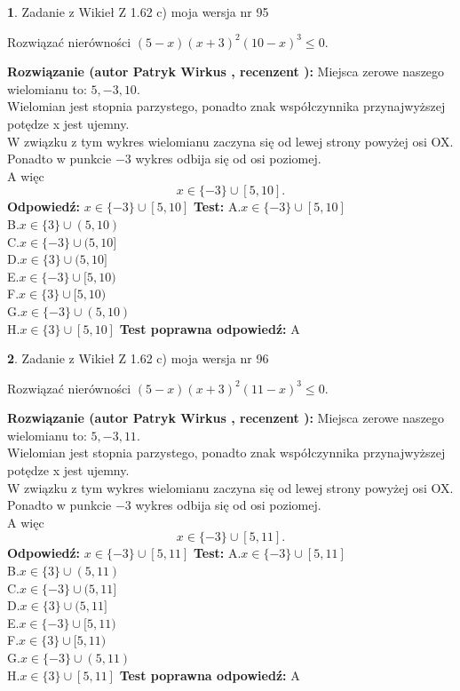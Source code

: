 \documentclass[12pt, a4paper]{article}
\theoremstyle{definition} %
\newtheorem{zad}{}
\newcommand{\zadStart}[1]{\begin{zad}#1\newline}
\newcommand{\zadStop}{\end{zad}}
\newcommand{\rozwStart}[2]{\noindent \textbf{Rozwiązanie (autor #1 , recenzent #2): }\newline}
\newcommand{\rozwStop}{\newline}
\newcommand{\odpStart}{\noindent \textbf{Odpowiedź:}\newline}
\newcommand{\odpStop}{\newline}
\newcommand{\testStart}{\noindent \textbf{Test:}\newline}
\newcommand{\testStop}{\newline}
\newcommand{\kluczStart}{\noindent \textbf{Test poprawna odpowiedź:}\newline}
\newcommand{\kluczStop}{\newline}
\begin{document}
\zadStart{Zadanie z Wikieł Z 1.62 c) moja wersja nr 95}

Rozwiązać nierówności $(5-x)(x+3)^{2}(10-x)^{3}\le0$.
\zadStop
\rozwStart{Patryk Wirkus}{}
Miejsca zerowe naszego wielomianu to: $5, -3, 10$.\\
Wielomian jest stopnia parzystego, ponadto znak współczynnika przy\linebreak najwyższej potędze x jest ujemny.\\ W związku z tym wykres wielomianu zaczyna się od lewej strony powyżej osi OX.\\
Ponadto w punkcie $-3$ wykres odbija się od osi poziomej.\\
A więc $$x \in \{-3\} \cup [5,10].$$
\rozwStop
\odpStart
$x \in \{-3\} \cup [5,10]$
\odpStop
\testStart
A.$x \in \{-3\} \cup [5,10]$\\
B.$x \in \{3\} \cup (5,10)$\\
C.$x \in \{-3\} \cup (5,10]$\\
D.$x \in \{3\} \cup (5,10]$\\
E.$x \in \{-3\} \cup [5,10)$\\
F.$x \in \{3\} \cup [5,10)$\\
G.$x \in \{-3\} \cup (5,10)$\\
H.$x \in \{3\} \cup [5,10]$
\testStop
\kluczStart
A
\kluczStop



\zadStart{Zadanie z Wikieł Z 1.62 c) moja wersja nr 96}

Rozwiązać nierówności $(5-x)(x+3)^{2}(11-x)^{3}\le0$.
\zadStop
\rozwStart{Patryk Wirkus}{}
Miejsca zerowe naszego wielomianu to: $5, -3, 11$.\\
Wielomian jest stopnia parzystego, ponadto znak współczynnika przy\linebreak najwyższej potędze x jest ujemny.\\ W związku z tym wykres wielomianu zaczyna się od lewej strony powyżej osi OX.\\
Ponadto w punkcie $-3$ wykres odbija się od osi poziomej.\\
A więc $$x \in \{-3\} \cup [5,11].$$
\rozwStop
\odpStart
$x \in \{-3\} \cup [5,11]$
\odpStop
\testStart
A.$x \in \{-3\} \cup [5,11]$\\
B.$x \in \{3\} \cup (5,11)$\\
C.$x \in \{-3\} \cup (5,11]$\\
D.$x \in \{3\} \cup (5,11]$\\
E.$x \in \{-3\} \cup [5,11)$\\
F.$x \in \{3\} \cup [5,11)$\\
G.$x \in \{-3\} \cup (5,11)$\\
H.$x \in \{3\} \cup [5,11]$
\testStop
\kluczStart
A
\kluczStop
\end{document}
